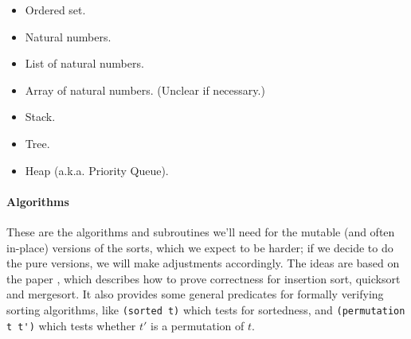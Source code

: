 \documentclass{article}
\begin{document}
\begin{itemize}
  \item Ordered set.
  \item Natural numbers.
  \item List of natural numbers.
  \item Array of natural numbers.
    (Unclear if necessary.)
  \item Stack.
  \item Tree.
  \item Heap (a.k.a. Priority Queue).
\end{itemize}

\paragraph{Algorithms}
These are the algorithms and subroutines we'll need for the mutable (and often
in-place) versions of the sorts, which we expect to be harder; if we decide to
do the pure versions, we will make adjustments accordingly. The ideas are based
on the paper \cite{filliatre1999certification}, which describes how to prove
correctness for insertion sort, quicksort and mergesort. It also provides some
general predicates for formally verifying sorting algorithms, like
\verb|(sorted t)| which tests for sortedness, and \verb|(permutation t t')|
which tests whether $t'$ is a permutation of $t$.
\end{document}
